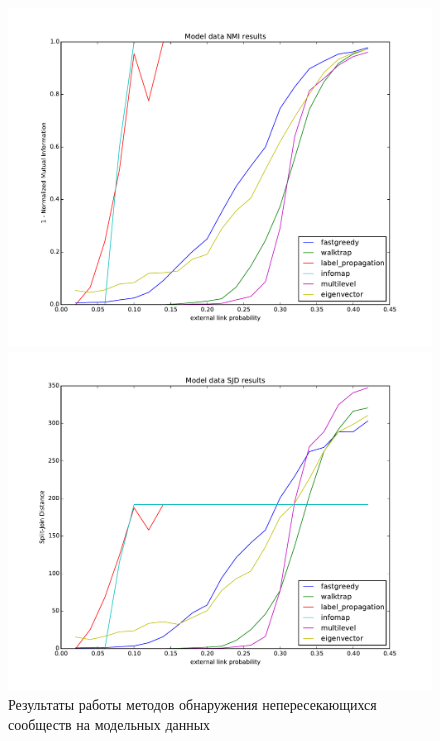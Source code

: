 \documentclass[12pt]{article}
\begin{document}
\begin{figure}[h]
	\begin{minipage}{0.5\textwidth}
		\includegraphics[scale=0.345]{pics/model_data_nmi}
	\end{minipage}
	\begin{minipage}{0.5\textwidth}
		\includegraphics[scale=0.345]{pics/model_data_sjd}
	\end{minipage}
	\caption{Результаты работы методов обнаружения непересекающихся сообществ на модельных данных \label{fig::model_data_results}}
\end{figure}
\end{document}

